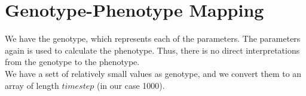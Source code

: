 \section{Genotype-Phenotype Mapping}

We have the genotype, which represents each of the parameters. The parameters
again is used to calculate the phenotype. Thus, there is no direct interpretations
from the genotype to the phenotype. \\

We have a sett of relatively small values as genotype, and we convert them to an
array of length $timestep$ (in our case 1000). 